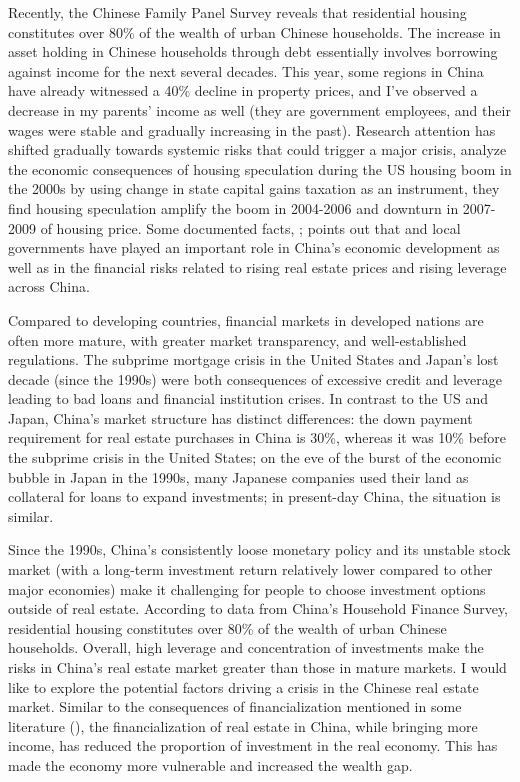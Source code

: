 \documentclass[12pt,english]{article}
\begin{document}
	Recently, the Chinese Family Panel Survey reveals that residential housing constitutes over 80\% of the wealth of urban Chinese households. The increase in asset holding in Chinese households through debt essentially involves borrowing against income for the next several decades. This year, some regions in China have already witnessed a 40\% decline in property prices, and I've observed a decrease in my parents' income as well (they are government employees, and their wages were stable and gradually increasing in the past). Research attention has shifted gradually towards systemic risks that could trigger a major crisis, \cite{gao2020economic} analyze the economic consequences of housing speculation during the US housing boom in the 2000s by using change in state capital gains taxation as an instrument, they find housing speculation amplify the boom in 2004-2006 and downturn in 2007-2009 of housing price. Some documented facts, \cite{liu2018china}; \cite{song2018risks} points out that and local governments have played an important role in China’s economic development as well as in the financial risks related to rising real estate prices and rising leverage across China.
	
	Compared to developing countries, financial markets in developed nations are often more mature, with greater market transparency, and well-established regulations. The subprime mortgage crisis in the United States and Japan's lost decade (since the 1990s) were both consequences of excessive credit and leverage leading to bad loans and financial institution crises. In contrast to the US and Japan, China's market structure has distinct differences: the down payment requirement for real estate purchases in China is 30\%, whereas it was 10\% before the subprime crisis in the United States; on the eve of the burst of the economic bubble in Japan in the 1990s, many Japanese companies used their land as collateral for loans to expand investments; in present-day China, the situation is similar.
	
	Since the 1990s, China's consistently loose monetary policy and its unstable stock market (with a long-term investment return relatively lower compared to other major economies) make it challenging for people to choose investment options outside of real estate. According to data from China's Household Finance Survey, residential housing constitutes over 80\% of the wealth of urban Chinese households. Overall, high leverage and concentration of investments make the risks in China's real estate market greater than those in mature markets. I would like to explore the potential factors driving a crisis in the Chinese real estate market.
	Similar to the consequences of financialization mentioned in some literature (\citealp{van2013financialization}), the financialization of real estate in China, while bringing more income, has reduced the proportion of investment in the real economy. This has made the economy more vulnerable and increased the wealth gap.
	
\end{document}
